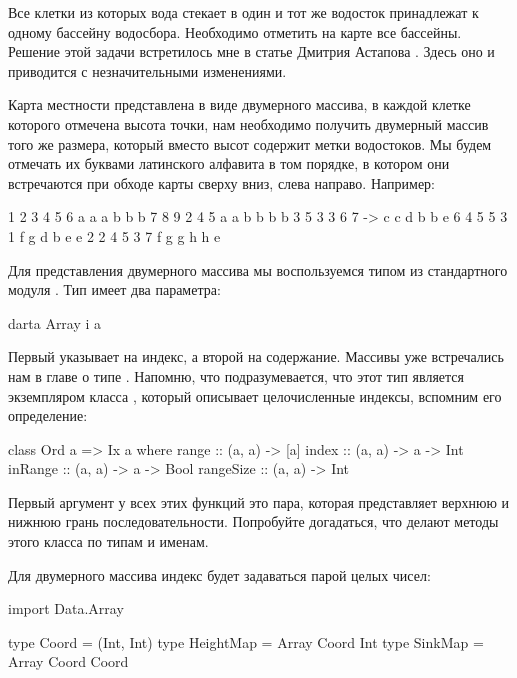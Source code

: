 Все клетки из которых вода стекает в один и тот же
водосток принадлежат к одному бассейну водосбора. 
Необходимо отметить на карте все бассейны. Решение
этой задачи встретилось мне в статье Дмитрия Астапова
.
Здесь оно и приводится с незначительными изменениями.

Карта местности представлена в виде двумерного массива,
в каждой клетке которого отмечена высота точки,
нам необходимо получить двумерный массив того же размера,
который вместо высот содержит метки водостоков. Мы будем 
отмечать их буквами латинского алфавита в том порядке,
в котором они встречаются при обходе карты сверху вниз,
слева направо. Например:

\begin{code}
1 2 3 4 5 6       a a a b b b
7 8 9 2 4 5       a a b b b b
3 5 3 3 6 7   ->  c c d b b e 
6 4 5 5 3 1       f g d b e e
2 2 4 5 3 7       f g g h h e
\end{code}

Для представления двумерного массива мы воспользуемся
типом  из стандартного модуля .
Тип  имеет два параметра:

\begin{code}
darta Array i a
\end{code}

Первый указывает на индекс, а второй на содержание. 
Массивы уже встречались нам в главе о типе .
Напомню, что подразумевается, что этот тип является экземпляром
класса , который описывает целочисленные индексы,
вспомним его определение:

\begin{code}
class Ord a => Ix a where
    range       :: (a, a) -> [a]
    index       :: (a, a) -> a -> Int
    inRange     :: (a, a) -> a -> Bool
    rangeSize   :: (a, a) -> Int
\end{code}

Первый аргумент у всех этих функций это пара, которая 
представляет верхнюю и нижнюю грань последовательности. 
Попробуйте догадаться, что делают методы этого класса 
по типам и именам.

Для двумерного массива индекс будет задаваться парой целых
чисел:

\begin{code}
import Data.Array

type Coord = (Int, Int)
type HeightMap = Array Coord Int
type SinkMap   = Array Coord Coord
\end{code}

